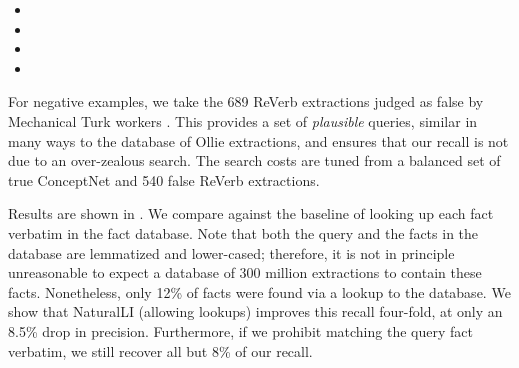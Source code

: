 \begin{itemize}
\setlength{\itemsep}{-4pt}
\item[] 
\item[] 
\item[] 
\item[] 
\end{itemize}

For negative examples, we take the 689 ReVerb extractions
  \cite{key:2011fader-reverb}
  judged as false by Mechanical Turk workers \cite{2013angeli-truth}.
This provides a set of \textit{plausible} queries, similar in many
  ways to the database of Ollie extractions, and ensures that our
  recall is not due to an over-zealous search.
The search costs are tuned from a balanced set of true ConceptNet and
  540 false ReVerb extractions.

Results are shown in .
We compare against the baseline of looking up each fact verbatim in the
  fact database.
Note that both the query and the facts in the database are lemmatized
  and lower-cased; therefore, it is not in principle unreasonable to
  expect a database of 300 million extractions to contain these
  facts.
Nonetheless, only 12\% of facts were found via a lookup to the
  database.
We show that NaturalLI (allowing lookups) improves this recall
  four-fold, at only an 8.5\% drop in precision.
Furthermore, if we prohibit matching the query fact verbatim,
  we still recover all but 8\% of our recall.



%
%
